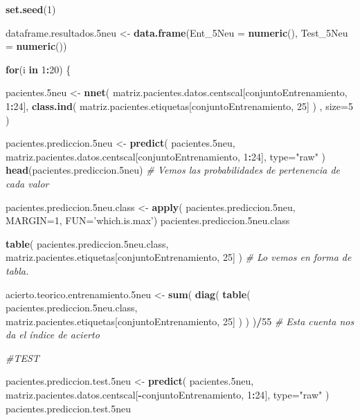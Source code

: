\documentclass[]{article}
\newenvironment{Shaded}{\begin{snugshade}}{\end{snugshade}}
\newcommand{\KeywordTok}[1]{\textcolor[rgb]{0.13,0.29,0.53}{\textbf{#1}}}
\newcommand{\DataTypeTok}[1]{\textcolor[rgb]{0.13,0.29,0.53}{#1}}
\newcommand{\DecValTok}[1]{\textcolor[rgb]{0.00,0.00,0.81}{#1}}
\newcommand{\StringTok}[1]{\textcolor[rgb]{0.31,0.60,0.02}{#1}}
\newcommand{\CommentTok}[1]{\textcolor[rgb]{0.56,0.35,0.01}{\textit{#1}}}
\newcommand{\ControlFlowTok}[1]{\textcolor[rgb]{0.13,0.29,0.53}{\textbf{#1}}}
\newcommand{\OperatorTok}[1]{\textcolor[rgb]{0.81,0.36,0.00}{\textbf{#1}}}
\newcommand{\NormalTok}[1]{#1}
\begin{document}
\begin{Shaded}
\begin{Highlighting}[]
\KeywordTok{set.seed}\NormalTok{(}\DecValTok{1}\NormalTok{)}

\NormalTok{dataframe.resultados.5neu <-}\StringTok{ }\KeywordTok{data.frame}\NormalTok{(}\DataTypeTok{Ent_5Neu =} \KeywordTok{numeric}\NormalTok{(),}
                                        \DataTypeTok{Test_5Neu =} \KeywordTok{numeric}\NormalTok{())}

\ControlFlowTok{for}\NormalTok{(i }\ControlFlowTok{in} \DecValTok{1}\OperatorTok{:}\DecValTok{20}\NormalTok{)}
\NormalTok{\{}

\NormalTok{  pacientes.5neu <-}\StringTok{ }\KeywordTok{nnet}\NormalTok{( matriz.pacientes.datos.centscal[conjuntoEntrenamiento, }\DecValTok{1}\OperatorTok{:}\DecValTok{24}\NormalTok{], }\KeywordTok{class.ind}\NormalTok{( matriz.pacientes.etiquetas[conjuntoEntrenamiento, }\DecValTok{25}\NormalTok{] ) , }\DataTypeTok{size=}\DecValTok{5}\NormalTok{ )}
  
\NormalTok{  pacientes.prediccion.5neu <-}\StringTok{ }\KeywordTok{predict}\NormalTok{( pacientes.5neu, matriz.pacientes.datos.centscal[conjuntoEntrenamiento, }\DecValTok{1}\OperatorTok{:}\DecValTok{24}\NormalTok{], }\DataTypeTok{type=}\StringTok{"raw"}\NormalTok{ )}
  \KeywordTok{head}\NormalTok{(pacientes.prediccion.5neu) }\CommentTok{# Vemos las probabilidades de pertenencia de cada valor}
  
\NormalTok{  pacientes.prediccion.5neu.class <-}\StringTok{ }\KeywordTok{apply}\NormalTok{( pacientes.prediccion.5neu, }\DataTypeTok{MARGIN=}\DecValTok{1}\NormalTok{, }\DataTypeTok{FUN=}\StringTok{'which.is.max'}\NormalTok{)}
\NormalTok{  pacientes.prediccion.5neu.class}
  
  \KeywordTok{table}\NormalTok{( pacientes.prediccion.5neu.class, matriz.pacientes.etiquetas[conjuntoEntrenamiento, }\DecValTok{25}\NormalTok{] )  }\CommentTok{# Lo vemos en forma de tabla.}
  
\NormalTok{  acierto.teorico.entrenamiento.5neu <-}\StringTok{ }\KeywordTok{sum}\NormalTok{( }\KeywordTok{diag}\NormalTok{( }\KeywordTok{table}\NormalTok{( pacientes.prediccion.5neu.class, matriz.pacientes.etiquetas[conjuntoEntrenamiento, }\DecValTok{25}\NormalTok{] ) ) )}\OperatorTok{/}\DecValTok{55} \CommentTok{# Esta cuenta nos da el índice de acierto}
  
  \CommentTok{#TEST}
  
\NormalTok{  pacientes.prediccion.test.5neu <-}\StringTok{ }\KeywordTok{predict}\NormalTok{( pacientes.5neu, matriz.pacientes.datos.centscal[}\OperatorTok{-}\NormalTok{conjuntoEntrenamiento, }\DecValTok{1}\OperatorTok{:}\DecValTok{24}\NormalTok{], }\DataTypeTok{type=}\StringTok{"raw"}\NormalTok{ )}
\NormalTok{  pacientes.prediccion.test.5neu}
  

\end{Highlighting}
\end{Shaded}
\end{document}
